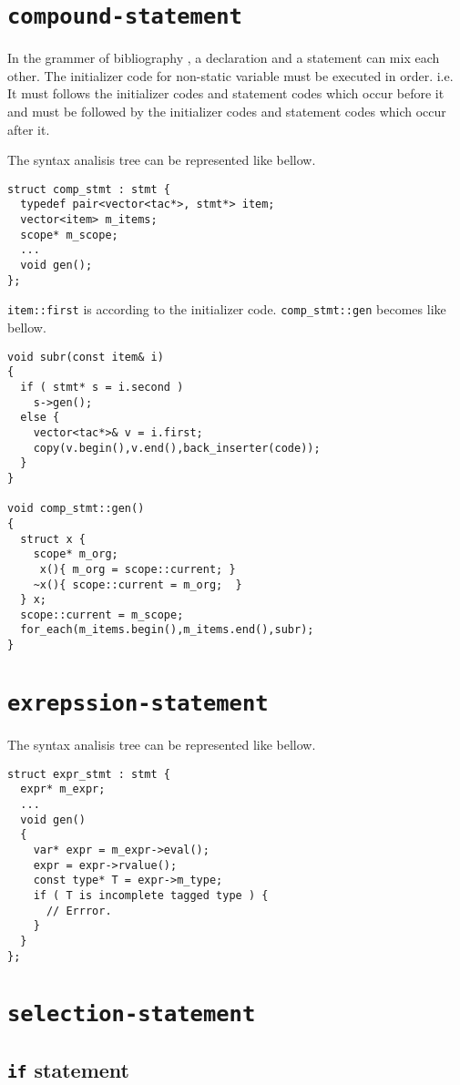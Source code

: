 \section{{\tt{compound-statement}}}

In the grammer of bibliography \cite{ISO}, a declaration and a statement
can mix each other. The initializer code for non-static variable must
be executed in order. i.e. It must follows the initializer codes and
statement codes which occur before it and must be followed by
the initializer codes and
statement codes which occur after it.

The syntax analisis tree can be represented like bellow.
\begin{verbatim}
struct comp_stmt : stmt {
  typedef pair<vector<tac*>, stmt*> item;
  vector<item> m_items;
  scope* m_scope;
  ...
  void gen();
};
\end{verbatim}
{\tt{item::first}} is according to the initializer code.
{\tt{comp\_stmt::gen}} becomes like bellow.
\begin{verbatim}
void subr(const item& i)
{
  if ( stmt* s = i.second )
    s->gen();
  else {
    vector<tac*>& v = i.first;
    copy(v.begin(),v.end(),back_inserter(code));
  }
}

void comp_stmt::gen()
{
  struct x {
    scope* m_org;
     x(){ m_org = scope::current; }
    ~x(){ scope::current = m_org;  }
  } x;
  scope::current = m_scope;
  for_each(m_items.begin(),m_items.end(),subr);
}
\end{verbatim}

\section{{\tt{exrepssion-statement}}}

The syntax analisis tree can be represented like bellow.
\begin{verbatim}
struct expr_stmt : stmt {
  expr* m_expr;
  ...
  void gen()
  {
    var* expr = m_expr->eval();
    expr = expr->rvalue();
    const type* T = expr->m_type;
    if ( T is incomplete tagged type ) {
      // Errror.
    }
  }
};
\end{verbatim}

\section{{\tt{selection-statement}}}

\subsection{{\tt{if}} statement}

